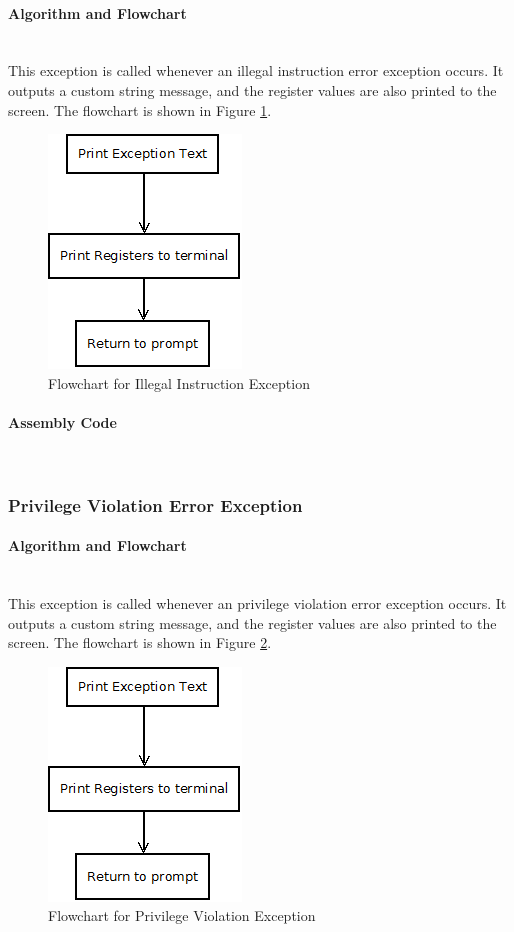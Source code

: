 \documentclass[12pt]{article}
\begin{document}
			\paragraph{Algorithm and Flowchart}~\\
			This exception is called whenever an illegal instruction error exception occurs. It outputs a custom string message, and the register values are also printed to the screen. The flowchart is shown in Figure \ref{fig:Exception}.
			
\begin{figure}[H]
\centering
\includegraphics[width=0.3\linewidth]{Exception}
\caption{Flowchart for Illegal Instruction Exception}
\label{fig:Exception}
\end{figure}
			\paragraph{Assembly Code}~\\	
			
			\subsubsection{Privilege Violation Error Exception}
			\paragraph{Algorithm and Flowchart}~\\
			This exception is called whenever an privilege violation error exception occurs. It outputs a custom string message, and the register values are also printed to the screen. The flowchart is shown in Figure \ref{fig:priv}.
			
			
\begin{figure}[H]
\centering
\includegraphics[width=0.3\linewidth]{Exception}
\caption{Flowchart for Privilege Violation Exception}
\label{fig:priv}
\end{figure}
\end{document}
